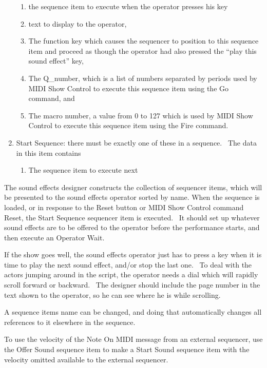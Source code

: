 \documentclass[letterpaper]{article}
\begin{document}
\begin{enumerate}
\begin{enumerate}
\item the sequence item to execute when the operator presses his key
\item text to display to the operator, 
\item The function key which causes the sequencer to position to this
sequence item and proceed as though the operator had also pressed the
“play this sound effect” key,
\item The Q\_number, which is a list of numbers separated by periods
used by MIDI Show Control to execute this sequence item using the Go
command, and
\item The macro number, a value from 0 to 127 which is used by MIDI Show
Control to execute this sequence item using the Fire command.
\end{enumerate}
\item Start Sequence: there must be exactly one of these in a sequence.
\ The data in this item contains

\begin{enumerate}
\item The sequence item to execute next
\end{enumerate}
\end{enumerate}
The sound effects designer constructs the collection of sequencer items,
which will be presented to the sound effects operator sorted by name.
When the sequence is loaded, or in response to the Reset button or MIDI
Show Control command Reset, the Start Sequence sequencer item is
executed. \ It should set up whatever sound effects are to be offered
to the operator before the performance starts, and then execute an
Operator Wait.

If the show goes well, the sound effects operator just has to press a
key when it is time to play the next sound effect, and/or stop the last
one. \ To deal with the actors jumping around in the script, the
operator needs a dial which will rapidly scroll forward or backward.
\ The designer should include the page number in the text shown to the
operator, so he can see where he is while scrolling.

A sequence item{\textquotesingle}s name can be changed, and doing that
automatically changes all references to it elsewhere in the sequence.

To use the velocity of the Note On MIDI message from an external
sequencer, use the Offer Sound sequence item to make a Start Sound
sequence item with the velocity omitted available to the external
sequencer.
\end{document}
